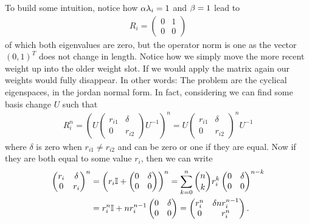 To build some intuition, notice how \(\alpha\lambda_i=1\) and \(\beta=1\)
lead to
\begin{align*}
	R_i
	=\begin{pmatrix}
		0 & 1 \\
		0 & 0
	\end{pmatrix}
\end{align*}
of which both eigenvalues are zero, but the operator norm is one as the vector
\((0, 1)^T\) does not change in length. Notice how we simply move the more
recent weight up into the older weight slot. If we would apply the matrix again
our weights would fully disappear. In other words: The problem are the cyclical
eigenspaces, in the jordan normal form. In fact, considering we can find some
basis change \(U\) such that
\begin{align*}
	R_i^n
	= \left(U 
		\begin{pmatrix}
			r_{i1} & \delta\\
			0 & r_{i2}
		\end{pmatrix}
	U^{-1}\right)^n
	= U 
	\begin{pmatrix}
		r_{i1} & \delta\\
		0 & r_{i2}
	\end{pmatrix}^n
	 U^{-1}
\end{align*}
where \(\delta\) is zero when \(r_{i1}\neq r_{i2}\) and can be zero or one if
they are equal. Now if they are both equal to some value \(r_i\), then we
can write
\begin{align*}
	\begin{pmatrix}
		r_i & \delta\\
		0 & r_i
	\end{pmatrix}^n
	&= \left(r_i\mathbb{I} + 
	\begin{pmatrix}
		0 & \delta\\
		0 & 0 
	\end{pmatrix}\right)^n
	= \sum_{k=0}^n {n\choose k} r_i^k \begin{pmatrix}
		0 & \delta \\
		0 & 0
	\end{pmatrix}^{n-k}\\
	&= r_i^n\mathbb{I} + n r_i^{n-1}\begin{pmatrix}
		0 & \delta \\
		0 & 0
	\end{pmatrix}
	= \begin{pmatrix}
		r_i^n & \delta n r_i^{n-1} \\
		0 & r_i^n
	\end{pmatrix}.
\end{align*}

